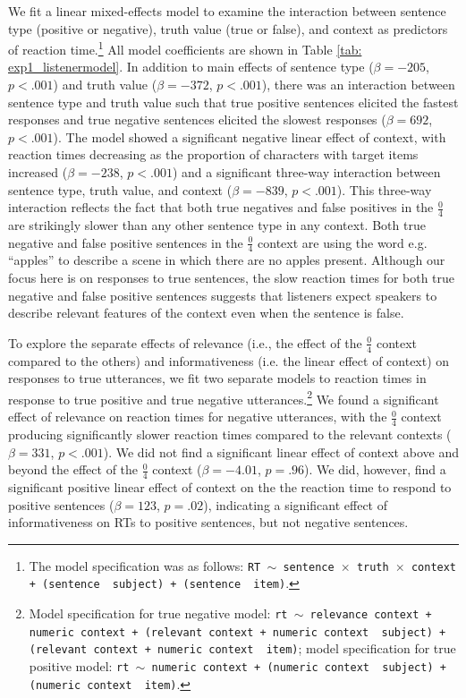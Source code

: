 \documentclass[man, floatsintext, noapacite]{apa6}
\begin{document}
We fit a linear mixed-effects model to examine the interaction between sentence type (positive or negative), truth value (true or false), and context as predictors of reaction time.\footnote{The model specification was as follows: \texttt{RT $\sim$ sentence~$\times$~truth~$\times$~context + (sentence~\textbar~subject) +  (sentence~\textbar~item)}.} All model coefficients are shown in Table \ref{tab: exp1_listenermodel}. In addition to main effects of sentence type ($\beta= -205$, $p< .001$) and truth value ($\beta= -372$, $p< .001$), there was an interaction between sentence type and truth value such that true positive sentences elicited the fastest responses and true negative sentences elicited the slowest responses ($\beta= 692$, $p< .001$). The model showed a significant negative linear effect of context, with reaction times decreasing as the proportion of characters with target items increased ($\beta= -238$, $p< .001$) and a significant three-way interaction between sentence type, truth value, and context ($\beta= -839$, $p< .001$).  This three-way interaction reflects the fact that both true negatives and false positives in the $\frac{0}{4}$ are strikingly slower than any other sentence type in any context. Both true negative and false positive sentences in the $\frac{0}{4}$ context are using the word e.g. ``apples'' to describe a scene in which there are no apples present. Although our focus here is on responses to true sentences, the slow reaction times for both true negative and false positive sentences suggests that listeners expect speakers to describe relevant features of the context even when the sentence is false. 

To explore the separate effects of relevance (i.e., the effect of the $\frac{0}{4}$ context compared to the others) and informativeness (i.e. the linear effect of context) on responses to true utterances, we fit two separate models to reaction times in response to true positive and true negative utterances.\footnote{Model specification for true negative model: \texttt{rt $\sim$  relevance context + numeric context + (relevant context + numeric context~\textbar~subject) +  (relevant context + numeric context~\textbar~item)}; model specification for true positive model: \texttt{rt $\sim$  numeric context + (numeric context~\textbar~subject) +  (numeric context~\textbar~item)}.} We found a significant effect of relevance on reaction times for negative utterances, with the $\frac{0}{4}$ context producing significantly slower reaction times compared to the relevant contexts ($\beta= 331$, $p< .001$). We did not find a significant linear effect of context above and beyond the effect of the  $\frac{0}{4}$ context ($\beta= -4.01$, $p = .96$). We did, however, find a significant positive linear effect of context on the the reaction time to respond to positive sentences ($\beta= 123$, $p = .02$), indicating a significant effect of informativeness on RTs to positive sentences, but not negative sentences. 
\end{document}
